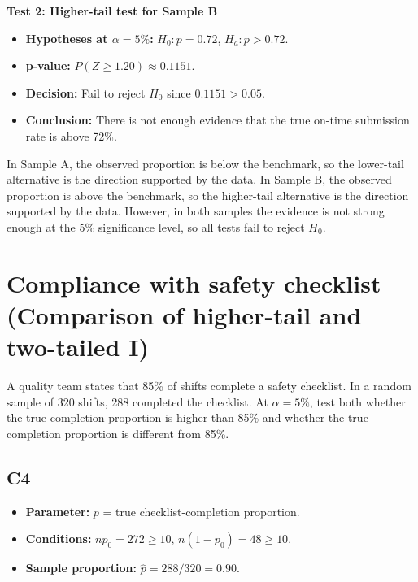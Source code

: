 \begin{center}
\end{center}


\textbf{Test 2: Higher-tail test for Sample B}

\begin{itemize}
	\item \textbf{Hypotheses at \(\alpha=5\%\):} \(H_0\colon p=0.72\), \(H_a\colon p>0.72\).
	\item \textbf{p-value:} \(P(Z\ge 1.20)\approx 0.1151\).
	\item \textbf{Decision:} Fail to reject \(H_0\) since \(0.1151>0.05\).
	\item \textbf{Conclusion:} There is not enough evidence that the true on-time submission rate is above 72\%.
\end{itemize}

\begin{center}
\end{center}


In Sample A, the observed proportion is below the benchmark, so the lower-tail alternative is the direction supported by the data. In Sample B, the observed proportion is above the benchmark, so the higher-tail alternative is the direction supported by the data. However, in both samples the evidence is not strong enough at the \(5\%\) significance level, so all tests fail to reject \(H_0\).

\section{Compliance with safety checklist (Comparison of higher-tail and two-tailed I)}
A quality team states that 85\% of shifts complete a safety checklist. In a random sample of 320 shifts, 288 completed the checklist. At \(\alpha=5\%\), test both whether the true completion proportion is higher than 85\% and whether the true completion proportion is different from 85\%.

\subsection*{C4}
\begin{itemize}
	\item \textbf{Parameter:} \(p\) = true checklist-completion proportion.
	\item \textbf{Conditions:} \(np_0=272\ge10\), \(n(1-p_0)=48\ge10\).
	\item \textbf{Sample proportion:} \(\hat p=288/320=0.90\).
\end{itemize}

